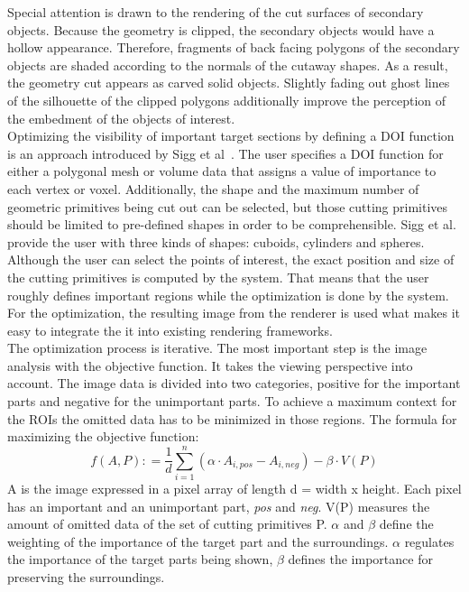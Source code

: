 Special attention is drawn to the rendering of the cut surfaces of secondary objects. Because the geometry is clipped, the secondary objects would have a hollow appearance. Therefore, fragments of back facing polygons of the secondary objects are shaded according to the normals of the cutaway shapes. As a result, the geometry cut appears as carved solid objects. Slightly fading out ghost lines of the silhouette of the clipped polygons additionally improve the perception of the embedment of the objects of interest.\\
\newline
Optimizing the visibility of important target sections by defining a DOI function is an approach introduced by Sigg et al~\cite{proc:intelligentCutaway}. The user specifies a DOI function for either a polygonal mesh or volume data that assigns a value of importance to each vertex or voxel. Additionally, the shape and the maximum number of geometric primitives being cut out can be selected, but those cutting primitives should be limited to pre-defined shapes in order to be comprehensible. Sigg et al. provide the user with three kinds of shapes: cuboids, cylinders and spheres. Although the user can select the points of interest, the exact position and size of the cutting primitives is computed by the system. That means that the user roughly defines important regions while the optimization is done by the system. For the optimization, the resulting image from the renderer is used what makes it easy to integrate the it into existing rendering frameworks.\\
The optimization process is iterative. The most important step is the image analysis with the objective function. It takes the viewing perspective into account. The image data is divided into two categories, positive for the important parts and negative for the unimportant parts. To achieve a maximum context for the ROIs the omitted data has to be minimized in those regions. The formula for maximizing the objective function:\\
\begin{equation}
f(A, P) \colon= \frac{1}{d} \sum^n_{i=1} (\alpha\cdot A_{i,pos} - A_{i,neg}) - \beta\cdot V(P)
\label{eq: bla}
\end{equation}
A is the image expressed in a pixel array of length d = width x height. Each pixel has an important and an unimportant part, \emph{pos} and \emph{neg}. V(P) measures the amount of omitted data of the set of cutting primitives P. $\alpha$ and $\beta$ define the weighting of the importance of the target part and the surroundings. $\alpha$ regulates the importance of the target parts being shown, $\beta$ defines the importance for preserving the surroundings.\\
